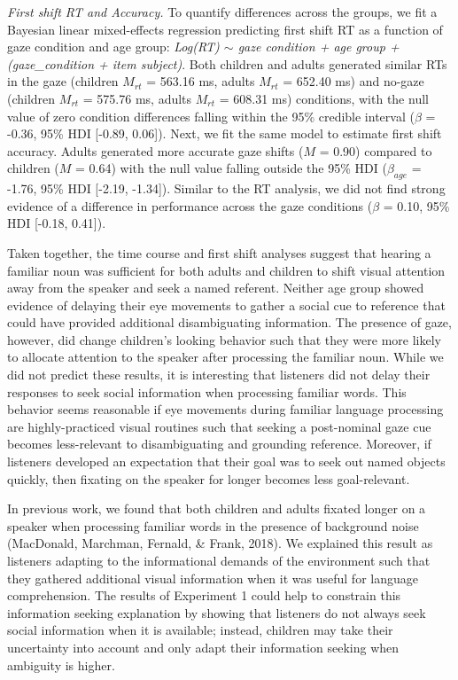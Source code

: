 \documentclass[man,floatsintext]{apa6}
\begin{document}
\emph{First shift RT and Accuracy.} To quantify differences across the
groups, we fit a Bayesian linear mixed-effects regression predicting
first shift RT as a function of gaze condition and age group:
\emph{Log(RT) \(\sim\) gaze condition + age group + (gaze\_condition +
item \textbar{} subject)}. Both children and adults generated similar
RTs in the gaze (children \(M_{rt}\) = 563.16 ms, adults \(M_{rt}\) =
652.40 ms) and no-gaze (children \(M_{rt}\) = 575.76 ms, adults
\(M_{rt}\) = 608.31 ms) conditions, with the null value of zero
condition differences falling within the 95\% credible interval
(\(\beta\) = -0.36, 95\% HDI {[}-0.89, 0.06{]}). Next, we fit the same
model to estimate first shift accuracy. Adults generated more accurate
gaze shifts (\(M\) = 0.90) compared to children (\(M\) = 0.64) with the
null value falling outside the 95\% HDI (\(\beta_{age}\) = -1.76, 95\%
HDI {[}-2.19, -1.34{]}). Similar to the RT analysis, we did not find
strong evidence of a difference in performance across the gaze
conditions (\(\beta\) = 0.10, 95\% HDI {[}-0.18, 0.41{]}).

Taken together, the time course and first shift analyses suggest that
hearing a familiar noun was sufficient for both adults and children to
shift visual attention away from the speaker and seek a named referent.
Neither age group showed evidence of delaying their eye movements to
gather a social cue to reference that could have provided additional
disambiguating information. The presence of gaze, however, did change
children's looking behavior such that they were more likely to allocate
attention to the speaker after processing the familiar noun. While we
did not predict these results, it is interesting that listeners did not
delay their responses to seek social information when processing
familiar words. This behavior seems reasonable if eye movements during
familiar language processing are highly-practiced visual routines such
that seeking a post-nominal gaze cue becomes less-relevant to
disambiguating and grounding reference. Moreover, if listeners developed
an expectation that their goal was to seek out named objects quickly,
then fixating on the speaker for longer becomes less goal-relevant.

In previous work, we found that both children and adults fixated longer
on a speaker when processing familiar words in the presence of
background noise (MacDonald, Marchman, Fernald, \& Frank, 2018). We
explained this result as listeners adapting to the informational demands
of the environment such that they gathered additional visual information
when it was useful for language comprehension. The results of Experiment
1 could help to constrain this information seeking explanation by
showing that listeners do not always seek social information when it is
available; instead, children may take their uncertainty into account and
only adapt their information seeking when ambiguity is higher.
\end{document}
